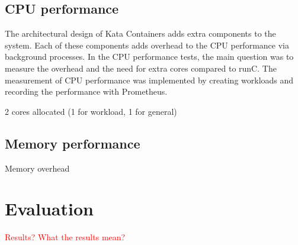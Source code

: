 \subsection{CPU performance}

The architectural design of Kata Containers adds extra components to the system. Each of these components adds overhead to the CPU performance via background processes. In the CPU performance tests, the main question was to measure the overhead and the need for extra cores compared to runC. The measurement of CPU performance was implemented by creating workloads and recording the performance with Prometheus. 

2 cores allocated (1 for workload, 1 for general)

\subsection{Memory performance}

Memory overhead

\section{Evaluation}

\textcolor{red}{Results?}
\textcolor{red}{What the results mean?}
